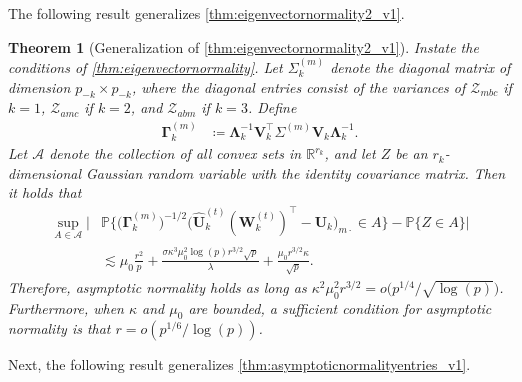 \documentclass[10pt]{article}
\newcommand{\0}{{\mathbf{0}}}
\newcommand{\1}{{\mathbf{1}}}
\newcommand{\U}{{\mathbf{U}}}
\renewcommand{\t}{^{\top}}
\newcommand{\uhat}{\mathbf{\hat{U}}}
\newtheorem{theorem}{Theorem}
\newcommand{\p}{\mathbb{P}}
\newcommand{\inv}{^{-1}}
\renewcommand{\hat}{\widehat}
\renewcommand{\hat}{\widehat}
\begin{document}
\noindent 
The following result generalizes \cref{thm:eigenvectornormality2_v1}.  

 \begin{theorem}[Generalization of \cref{thm:eigenvectornormality2_v1}]\label{thm:eigenvectornormality2}
 Instate the conditions of \cref{thm:eigenvectornormality}.    Let $\Sigma_k^{(m)}$ denote the diagonal matrix of dimension  $p_{-k} \times p_{-k}$, where the diagonal entries consist of the variances of $\mathcal{Z}_{mbc}$ if $k = 1$, $\mathcal{Z}_{amc}$ if $k = 2$, and $\mathcal{Z}_{abm}$ if $k = 3$.  Define
  \begin{align*}
     \mathbf{\Gamma}^{(m)}_k &\coloneqq \mathbf{\Lambda}_k\inv \mathbf{V}_k\t \Sigma^{(m)} \mathbf{V}_k \mathbf{\Lambda}_k\inv.
 \end{align*}
 Let $\mathcal{A}$ denote the collection of all convex sets in  $\mathbb{R}^{r_k}$, and let $Z$  be an $r_k$-dimensional Gaussian random variable with the identity covariance matrix. Then it holds that
 \begin{align*}
      \sup_{A \in \mathcal{A}} | &\p\bigg\{   \big( \mathbf{\Gamma}^{(m)}_k \big)^{-1/2}  \bigg( \uhat_k^{(t)} (\mathbf{W}_k^{(t)})\t - \U_k \bigg)_{m\cdot} \in A \bigg\} - \p \{ Z \in A \} | \\
      &\lesssim \mu_0 \frac{r^2}{p} + \frac{\sigma\kappa^3 \mu_0^2 \log(p) r^{3/2} \sqrt{p}}{\lambda}  + \frac{\mu_0 r^{3/2} \kappa }{ \sqrt{p}}.
 \end{align*}
 Therefore, asymptotic normality holds as long as $\kappa^2 \mu_0^2 r^{3/2} = o\big(p^{1/4}/\sqrt{\log(p)}\big)$. Furthermore, when $\kappa$ and $\mu_0$ are bounded, a sufficient condition for asymptotic normality is that $r = o(p^{1/6}/\log(p))$. 
 \end{theorem}
 \noindent
 Next, the following result generalizes \cref{thm:asymptoticnormalityentries_v1}.  
 
\end{document}
